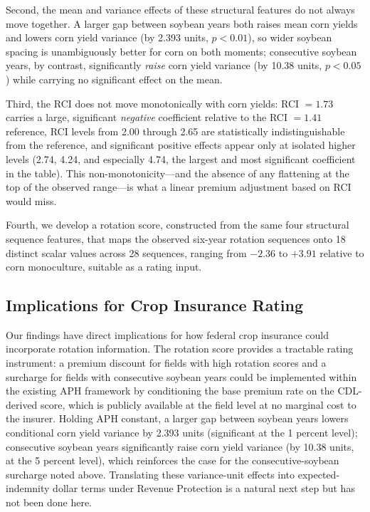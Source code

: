 \documentclass[12pt,letterpaper]{article}
\theoremstyle{remark}
\theoremstyle{remark}
\theoremstyle{plain}
\theoremstyle{definition}
\begin{document}
Second, the mean and variance effects of these structural features do not always move together. A larger gap between soybean years both raises mean corn yields and lowers corn yield variance (by 2.393 units, $p<0.01$), so wider soybean spacing is unambiguously better for corn on both moments; consecutive soybean years, by contrast, significantly \emph{raise} corn yield variance (by 10.38 units, $p<0.05$) while carrying no significant effect on the mean.
 
Third, the RCI does not move monotonically with corn yields: RCI $=1.73$ carries a large, significant \emph{negative} coefficient relative to the RCI $=1.41$ reference, RCI levels from 2.00 through 2.65 are statistically indistinguishable from the reference, and significant positive effects appear only at isolated higher levels (2.74, 4.24, and especially 4.74, the largest and most significant coefficient in the table). This non-monotonicity---and the absence of any flattening at the top of the observed range---is what a linear premium adjustment based on RCI would miss.
 
Fourth, we develop a rotation score, constructed from the same four structural sequence features, that maps the observed six-year rotation sequences onto 18 distinct scalar values across 28 sequences, ranging from $-2.36$ to $+3.91$ relative to corn monoculture, suitable as a rating input.
 
\subsection{\label{subsec:implications}Implications for Crop Insurance Rating}
 
Our findings have direct implications for how federal crop insurance could incorporate rotation information. The rotation score provides a tractable rating instrument: a premium discount for fields with high rotation scores and a surcharge for fields with consecutive soybean years could be implemented within the existing APH framework by conditioning the base premium rate on the CDL-derived score, which is publicly available at the field level at no marginal cost to the insurer. Holding APH constant, a larger gap between soybean years lowers conditional corn yield variance by 2.393 units (significant at the 1 percent level); consecutive soybean years significantly raise corn yield variance (by 10.38 units, at the 5 percent level), which reinforces the case for the consecutive-soybean surcharge noted above. Translating these variance-unit effects into expected-indemnity dollar terms under Revenue Protection is a natural next step but has not been done here.
 
\end{document}
